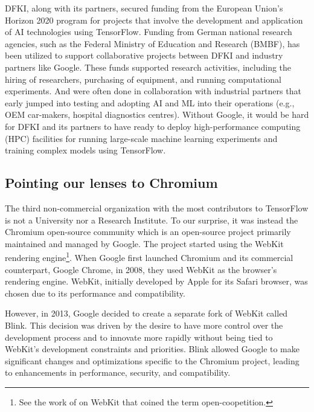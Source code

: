 \documentclass[CHICAGO,Times1COL]{WileyNJDv5} %
\begin{document}
DFKI, along with its partners, secured funding from the European Union's Horizon 2020 program for projects that involve the development and application of AI technologies using TensorFlow. 
Funding from German national research agencies, such as the Federal Ministry of Education and Research (BMBF), has been utilized to support collaborative projects between DFKI and industry partners like Google. These funds supported research activities, including the hiring of researchers, purchasing of equipment, and running computational experiments. And were often done in collaboration with industrial partners that early jumped into testing and adopting \ac{AI} and \ac{ML} into their operations (e.g., OEM car-makers, hospital diagnostics centres).
 Without Google, it would be hard for DFKI and its partners to have ready to deploy high-performance computing (HPC) facilities for running large-scale machine learning experiments and training complex models using TensorFlow.


\subsection{Pointing our lenses to Chromium}

The third non-commercial organization with the most contributors to TensorFlow is not a University nor a Research Institute. To our surprise, it was instead the Chromium open-source community which is an open-source project primarily maintained and managed by Google. The project started using the WebKit rendering engine\footnote{See the work of \citet{TeixeiraLin2014} on WebKit that coined the term open-coopetition.}. When Google first launched Chromium and its commercial counterpart, Google Chrome, in 2008, they used WebKit as the browser's rendering engine. WebKit, initially developed by Apple for its Safari browser, was chosen due to its performance and compatibility.

However, in 2013, Google decided to create a separate fork of WebKit called Blink. This decision was driven by the desire to have more control over the development process and to innovate more rapidly without being tied to WebKit's development constraints and priorities. Blink allowed Google to make significant changes and optimizations specific to the Chromium project, leading to enhancements in performance, security, and compatibility.
\end{document}
